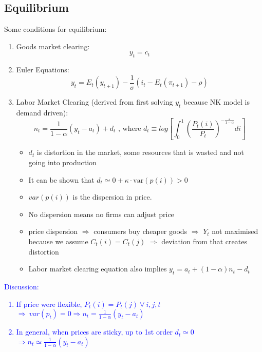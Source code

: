 \documentclass{article}
\begin{document}
\subsection{Equilibrium}
Some conditions for equilibrium:
\begin{enumerate}
    \item Goods market clearing: 
    $$y_t = c_t$$
    \item Euler Equations:
    $$y_t = E_t(y_{t+1}) - \frac{1}{\sigma}(i_t - E_t(\pi_{t+1}) - \rho)$$
    \item Labor Market Clearing (derived from first solving $y_t$ because NK model is demand driven):
    $$n_t = \frac{1}{1-\alpha}(y_t - a_t) + d_t\text{ , where }d_t \equiv log\left[\int_0^1\left(\frac{P_t(i)}{P_t}\right)^{-\frac{\varepsilon}{1-\alpha}}di\right]$$
    \begin{itemize}
        \item $d_t$ is distortion in the market, some resources that is wasted and not going into production
        \item It can be shown that $d_t \simeq 0 + \kappa\cdot \text{var}(p(i)) > 0$
        \item $var(p(i))$ is the dispersion in price.
        \item No dispersion means no firms can adjust price
        \item price dispersion $\Rightarrow$ consumers buy cheaper goods $\Rightarrow$ $Y_t$ not maximised because we assume $C_t(i) = C_t(j)$ $\Rightarrow$ deviation from that creates distortion
        \item Labor market clearing equation also implies $y_t = a_t + (1-\alpha)n_t - d_t$
    \end{itemize}

\end{enumerate}

\textcolor{blue}{Discussion:}
\textcolor{blue}{
\begin{enumerate}
    \item If price were flexible, $P_t(i) = P_t(j)\ \forall\ i, j, t$\\
    $\Rightarrow\ var(p_t) = 0 \Rightarrow n_t = \frac{1}{1-\alpha}(y_t - a_t)$
    \item In general, when prices are sticky, up to 1st order $d_t \simeq 0$\\
    $\Rightarrow n_t \simeq \frac{1}{1-\alpha}(y_t - a_t)$
\end{enumerate}
}
\end{document}

